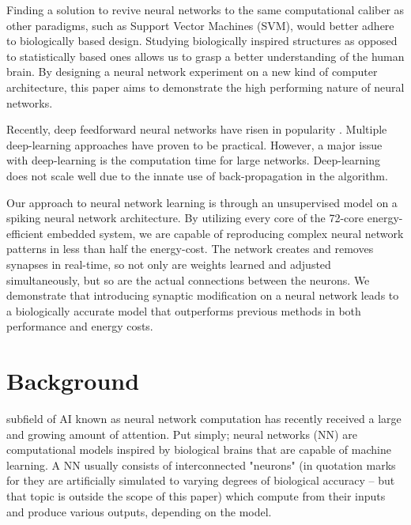 \documentclass[journal]{./sty/IEEEtran}
\begin{document}
Finding a solution to revive neural networks to the same computational caliber 
as other paradigms, such as Support Vector Machines (SVM), would better adhere to biologically based design.
Studying biologically inspired structures as opposed to statistically based ones allows us to grasp a better understanding of the human brain.
By designing a neural network experiment on a new kind of computer architecture, 
this paper aims to demonstrate the high performing nature of neural networks.

Recently, deep feedforward neural networks have risen in popularity \cite{DNN:Siniscalchi}. 
Multiple deep-learning approaches have proven to be practical.
However, a major issue with deep-learning is the computation time for large networks.
Deep-learning does not scale well due to the innate use of back-propagation in the algorithm.

Our approach to neural network learning is through an unsupervised model on a spiking neural network architecture.
By utilizing every core of the 72-core energy-efficient embedded system, 
we are capable of reproducing complex neural network patterns in less than half the energy-cost. 
The network creates and removes synapses in real-time, so not only are weights learned and adjusted simultaneously, 
but so are the actual connections between the neurons.
We demonstrate that introducing synaptic modification on a neural network leads to a biologically accurate model
that outperforms previous methods in both performance and energy costs.


\section{Background}
 subfield of AI known as neural network computation has recently received a large and growing amount of attention. 
Put simply; neural networks (NN) are computational models inspired by biological brains that are capable of machine learning. 
A NN usually consists of interconnected "neurons" (in quotation marks for they are artificially simulated to varying degrees of biological accuracy -- but that topic is outside the scope of this paper) which compute from their inputs and produce various outputs, depending on the model. 
\end{document}

